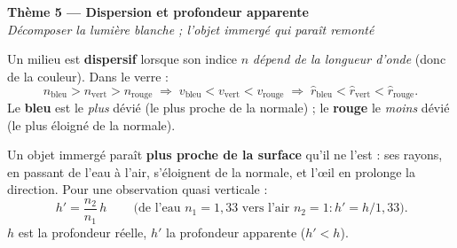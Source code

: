 \documentclass[11pt,a4paper]{article}
\begin{document}

\begin{center}
{\LARGE\bfseries\color{primarydark} Thème 5 — Dispersion et profondeur apparente}\\[2pt]
{\color{primary}\itshape Décomposer la lumière blanche ; l'objet immergé qui paraît remonté}
\end{center}

\begin{cle}
Un milieu est \textbf{dispersif} lorsque son indice $n$ \emph{dépend de la longueur d'onde} (donc de
la couleur). Dans le verre :
\[ n_{\text{bleu}}>n_{\text{vert}}>n_{\text{rouge}}
   \;\Rightarrow\; v_{\text{bleu}}<v_{\text{vert}}<v_{\text{rouge}}
   \;\Rightarrow\; \hat r_{\text{bleu}}<\hat r_{\text{vert}}<\hat r_{\text{rouge}}. \]
Le \textbf{bleu} est le \emph{plus} dévié (le plus proche de la normale) ; le \textbf{rouge} le
\emph{moins} dévié (le plus éloigné de la normale).
\end{cle}

\begin{center}
\end{center}

\begin{cle}
Un objet immergé paraît \textbf{plus proche de la surface} qu'il ne l'est : ses rayons, en passant de
l'eau à l'air, s'éloignent de la normale, et l'\oe il en prolonge la direction. Pour une observation
quasi verticale :
\[ \boxed{\,h'=\dfrac{n_2}{n_1}\,h\,}\qquad
   \text{(de l'eau } n_1=1{,}33 \text{ vers l'air } n_2=1 : h'=h/1{,}33). \]
$h$ est la profondeur réelle, $h'$ la profondeur apparente ($h'<h$).
\end{cle}
\end{document}

